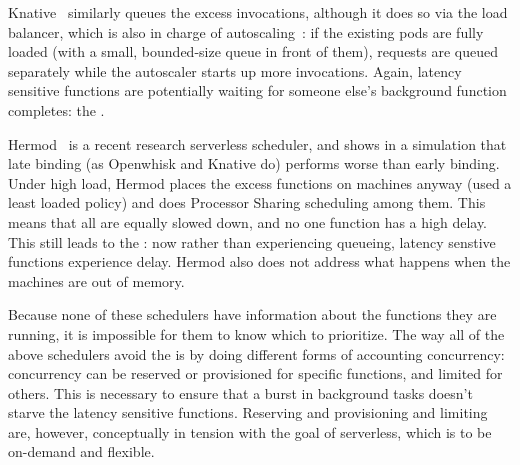 Knative~\cite{knative} similarly queues the excess invocations, although it does
so via the load balancer, which is also in charge of
autoscaling~\cite{knative-sched}: if the existing pods are fully loaded (with a
small, bounded-size queue in front of them), requests are queued separately
while the autoscaler starts up more invocations. Again, latency sensitive
functions are potentially waiting for someone else's background function
completes: the \problem{}.

Hermod~\cite{hermod} is a recent research serverless scheduler, and shows in a
simulation that late binding (as Openwhisk and Knative do) performs worse than
early binding. Under high load, Hermod places the excess functions on machines
anyway (used a least loaded policy) and does Processor Sharing scheduling among
them. This means that all are equally slowed down, and no one function has a
high delay. This still leads to the \problem{}: now rather than experiencing
queueing, latency senstive functions experience delay. Hermod also does not
address what happens when the machines are out of memory. 

Because none of these schedulers have information about the functions they are
running, it is impossible for them to know which to prioritize. The way all of
the above schedulers avoid the \problem{} is by doing different forms of
accounting concurrency: concurrency can be reserved or provisioned for specific
functions, and limited for others. This is necessary to ensure that a burst in
background tasks doesn't starve the latency sensitive functions. Reserving and
provisioning and limiting are, however, conceptually in tension with the goal of
serverless, which is to be on-demand and flexible.





